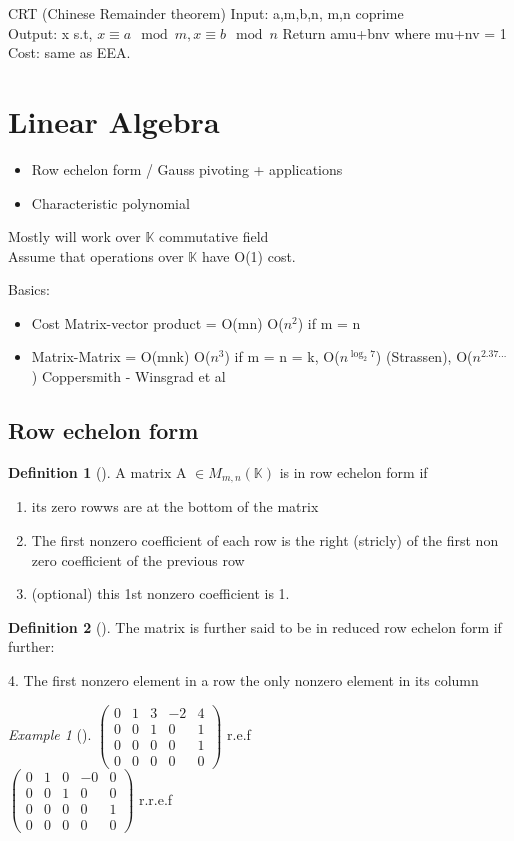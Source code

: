 \documentclass{article}
\theoremstyle{definition}
\newtheorem{definition}{Definition}
\theoremstyle{remark}
\newtheorem*{example}{Example}
\newcommand{\Ex}[3]{\begin{example}[#1]\label{#2}#3\end{example}}
\newcommand{\Def}[3]{\begin{definition}[#1]\label{#2}#3\end{definition}}
\newcommand{\K}{\mathbb{K}}
\begin{document}
CRT (Chinese Remainder theorem)
Input: a,m,b,n, m,n coprime\\
Output: x s.t, $x \equiv a \mod m, x \equiv b \mod n$
Return amu+bnv where mu+nv = 1
Cost: same as EEA.

\section{Linear Algebra}
\begin{itemize}
	\item Row echelon form / Gauss pivoting + applications
	\item Characteristic polynomial
\end{itemize}
Mostly will work over $\K$ commutative field\\
Assume that operations over $\K$ have O(1) cost.

Basics:\begin{itemize}
	\item Cost Matrix-vector product = O(mn) O($n^2$) if m = n
	\item Matrix-Matrix = O(mnk) O($n^3$) if m = n = k, O($n^{\log_2 7}$) (Strassen), O($n^{2.37\dots}$) Coppersmith - Winsgrad et al
\end{itemize}

\subsection{Row echelon form}
\Def{}{}{A matrix A $\in M_{m,n}(\K)$ is in row echelon form if
	\begin{enumerate}
		\item its zero rowws are at the bottom of the matrix
		\item The first nonzero coefficient of each row is the right (stricly) of the first non zero coefficient of the previous row
		\item(optional) this 1st nonzero coefficient is 1.
	\end{enumerate}}
	
	\Def{}{}{The matrix is further said to be in reduced row echelon form if further:
		
		4. The first nonzero element in a row the only nonzero element in its column}
	
	\Ex{}{}{$\begin{pmatrix}
		0&1&3&-2&4\\
		0&0&1&0&1\\
		0&0&0&0&1\\
		0&0&0&0&0
		\end{pmatrix}$ r.e.f\\
		
		$\begin{pmatrix}
		0&1&0&-0&0\\
		0&0&1&0&0\\
		0&0&0&0&1\\
		0&0&0&0&0
		\end{pmatrix}$ r.r.e.f}
	
\end{document}
